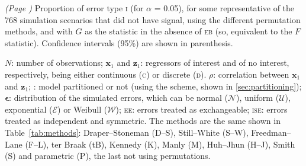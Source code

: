 \begin{table}[b!]
\caption[Amount of error type \textsc{i} for representative simulation scenarios.]{\emph{(Page \pageref{tab:methods_resultsT})} Proportion of error type \textsc{i} (for $\alpha$ = 0.05), for some representative of the 768 simulation scenarios that did not have signal, using the different permutation methods, and with $G$ as the statistic in the absence of \textsc{eb} (so, equivalent to the $F$ statistic). Confidence intervals (95\%) are shown in parenthesis.}
{\footnotesize
$N$: number of observations;
$\mathbf{x}_1$ and $\mathbf{z}_1$: regressors of interest and of no interest, respectively, being either continuous (\textsc{c}) or discrete (\textsc{d}).
$\rho$: correlation between $\mathbf{x}_1$ and $\mathbf{z}_1$;
: model partitioned or not (using the \citet{Beckmann2001} scheme, shown in \ref{sec:partitioning});
$\mathbf{\epsilon}$: distribution of the simulated errors, which can be normal ($\mathcal{N}$), uniform ($\mathcal{U}$), exponential ($\mathcal{E}$) or Weibull ($\mathcal{W}$);
\textsc{ee}: errors treated as exchangeable;
\textsc{ise}: errors treated as independent and symmetric.
The methods are the same shown in Table~\ref{tab:methods}: Draper--Stoneman (D--S), Still--White (S--W), Freedman--Lane (F--L), ter Braak (tB), Kennedy (K), Manly (M), Huh--Jhun (H--J), Smith (S) and parametric (P), the last not using permutations.
\par}
\label{tab:methods_resultsC}
\end{table}


